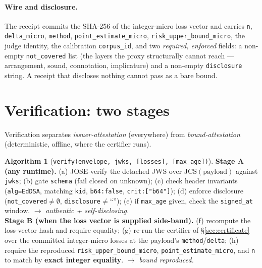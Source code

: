 \documentclass[11pt]{article}
\theoremstyle{definition}
\newtheorem{algo}{Algorithm}
\begin{document}
\paragraph{Wire and disclosure.}
The receipt commits the SHA-256 of the integer-micro loss vector and carries
\texttt{n}, \texttt{delta\_micro}, \texttt{method},
\texttt{point\_estimate\_micro}, \texttt{risk\_upper\_bound\_micro}, the
judge identity, the calibration \texttt{corpus\_id}, and two
\emph{required, enforced} fields: a non-empty \texttt{not\_covered} list
(the layers the proxy structurally cannot reach --- arrangement, sound,
connotation, implicature) and a non-empty \texttt{disclosure} string. A
receipt that discloses nothing cannot pass as a bare bound.

\section{Verification: two stages}\label{sec:verify}

Verification separates \emph{issuer-attestation} (everywhere) from
\emph{bound-attestation} (deterministic, offline, where the certifier runs).

\begin{algo}[{\texttt{verify(envelope, jwks, [losses], [max\_age])}}]
\label{alg:verify}
\sloppy
\textbf{Stage A (any runtime).} (a) JOSE-verify the detached JWS over
$\mathrm{JCS}(\text{payload})$ against \texttt{jwks}; (b) gate
\texttt{schema} (fail closed on unknown); (c) check header invariants
(\texttt{alg=EdDSA}, matching \texttt{kid}, \texttt{b64:false},
\texttt{crit:["b64"]}); (d) enforce disclosure
(\texttt{not\_covered}${}\ne\emptyset$, \texttt{disclosure}${}\ne{}$``'');
(e) if \texttt{max\_age} given, check the \texttt{signed\_at} window.
$\to$ \emph{authentic + self-disclosing.}\\
\textbf{Stage B (when the loss vector is supplied side-band).} (f) recompute
the loss-vector hash and require equality; (g) re-run the certifier of
\S\ref{sec:certificate} over the committed integer-micro losses at the
payload's \texttt{method}/\texttt{delta}; (h) require the reproduced
\texttt{risk\_upper\_bound\_micro}, \texttt{point\_estimate\_micro}, and
\texttt{n} to match by \textbf{exact integer equality}. $\to$ \emph{bound
reproduced.}
\end{algo}
\end{document}
